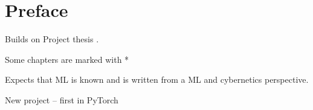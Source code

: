 \chapter*{Preface}

Builds on Project thesis \cite{project_thesis}.

Some chapters are marked with *

Expects that ML is known and is written from a ML and cybernetics perspective. 

New project -- first in PyTorch 